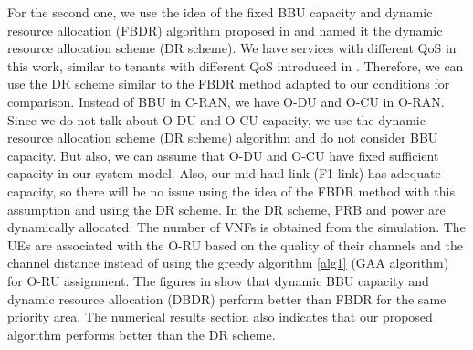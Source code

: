 \documentclass[lettersize,journal]{IEEEtran}
\begin{document}
For the second one, we use the idea of the fixed BBU capacity and dynamic resource allocation (FBDR) algorithm proposed in \cite{lee2018dynamic} and named it the dynamic resource allocation scheme (DR scheme). 
 We have services with different QoS in this work, similar to tenants with different QoS introduced in \cite{lee2018dynamic}. Therefore, we can use the DR scheme similar to the FBDR method adapted to our conditions for comparison. Instead of BBU in C-RAN, we have O-DU and O-CU in O-RAN.
 Since we do not talk about O-DU and O-CU capacity, we use the dynamic resource allocation scheme (DR scheme) algorithm and do not consider BBU capacity.
But also, we can assume that O-DU and O-CU have fixed sufficient capacity in our system model. Also, our mid-haul link (F1 link) has adequate capacity, so there will be no issue using the idea of the FBDR method with this assumption and using the DR scheme. In the DR scheme, PRB and power are dynamically allocated. The number of VNFs is obtained from the simulation. The UEs are associated with the O-RU based on the quality of their channels and the channel distance instead of using the greedy algorithm \ref{alg1} (GAA algorithm) for O-RU assignment. The figures in \cite{lee2018dynamic} show that dynamic BBU capacity and dynamic resource allocation (DBDR) perform better than FBDR for the same priority area. The numerical results section also indicates that our proposed algorithm performs better than the DR scheme.
\end{document}

